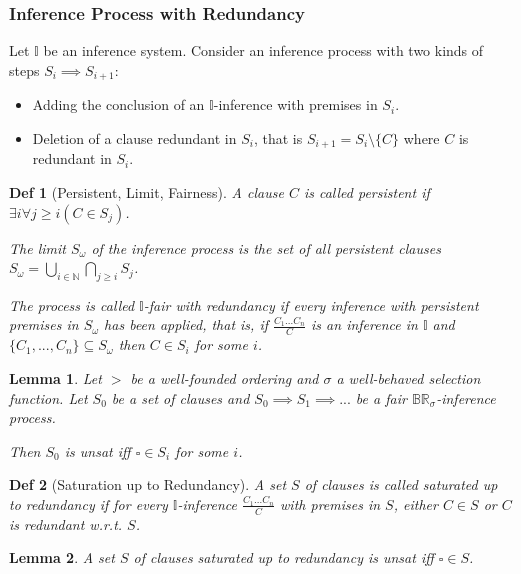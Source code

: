 \documentclass[]{article}
\newtheorem{lemma}{Lemma}
\newtheorem*{definition*}{Def}
\begin{document}
\subsubsection{Inference Process with Redundancy}

Let $\mathbb{I}$ be an inference system. Consider an inference process with two kinds of steps $S_i \implies S_{i+1}$:
\begin{itemize}
	\item Adding the conclusion of an $\mathbb{I}$-inference with premises in $S_i$.
	\item Deletion of a clause redundant in $S_i$, that is $S_{i+1}=S_i \setminus \{C\}$ where $C$ is redundant in $S_i$.
\end{itemize}

\begin{definition*}[Persistent, Limit, Fairness]
	A clause $C$ is called persistent if $\exists i \forall j \geq i (C \in S_j)$.
	
	The limit $S_\omega$ of the inference process is the set of all persistent clauses $S_\omega = \bigcup_{i\in\mathbb{N}} \bigcap_{j\geq i} S_j$.
	
	The process is called $\mathbb{I}$-fair with redundancy if every inference with persistent premises in $S_\omega$ has been applied, that is, if $\frac{C_1 ... C_n}{C}$ is an inference in $\mathbb{I}$ and $\{C_1,...,C_n\} \subseteq S_\omega$ then $C \in S_i$ for some $i$.
\end{definition*}

\begin{lemma}
	Let $>$ be a well-founded ordering and $\sigma$ a well-behaved selection function. Let $S_0$ be a set of clauses and $S_0 \implies S_1 \implies ...$ be a fair $\mathbb{BR}_\sigma$-inference process.
	
	Then $S_0$ is unsat iff $\square \in S_i$ for some $i$.
\end{lemma}

\begin{definition*}[Saturation up to Redundancy]
	A set $S$ of clauses is called saturated up to redundancy if for every $\mathbb{I}$-inference $\frac{C_1...C_n}{C}$ with premises in $S$, either $C \in S$ or $C$ is redundant w.r.t. $S$.
\end{definition*}

\begin{lemma}
	A set $S$ of clauses saturated up to redundancy is unsat iff $\square \in S$.
\end{lemma}
\end{document}

